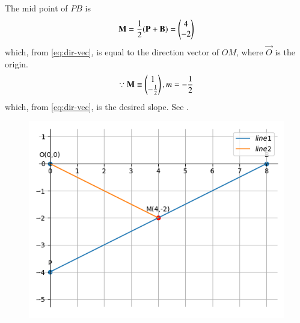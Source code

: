 The mid point of $PB$ is
\begin{align}
\mathbf{M} =\frac{1}{2}(\mathbf{P}+\mathbf{B})
	= \begin{pmatrix}4 \\ -2\end{pmatrix}  
\end{align}
which, from  \eqref{eq:dir-vec}, is equal to the direction vector of $OM$, where $\vec{O}$ is the origin.
\begin{align}
\because \mathbf{M} \equiv
	 \begin{pmatrix}1 \\ -\frac{1}{2}\end{pmatrix},
	m = -\frac{1}{2}
\end{align}
which, from \eqref{eq:dir-vec},  is the desired slope.
See 
		.
	\begin{figure}[!ht]
		\centering
 \includegraphics[width=\columnwidth]{chapters/11/10/1/5/figs/line.png}
		\caption{}
		\label{fig:11/10/1/5}
  	\end{figure}
